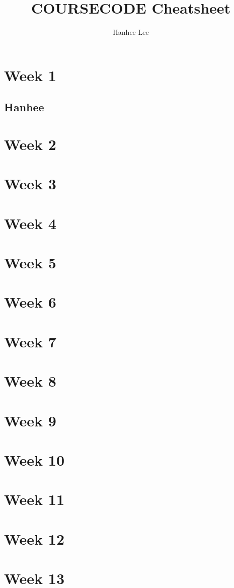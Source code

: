 \documentclass{article}
\title{COURSECODE Cheatsheet}
\author{Hanhee Lee}
\begin{document}
    \maketitle
    \tableofcontents
    \section{Week 1}
    \subsection{Hanhee}
    \section{Week 2}
    \section{Week 3}
    \section{Week 4}
    \section{Week 5}
    \section{Week 6}
    \section{Week 7}
    \section{Week 8}
    \section{Week 9}
    \section{Week 10}
    \section{Week 11}
    \section{Week 12}
    \section{Week 13}
\end{document}
